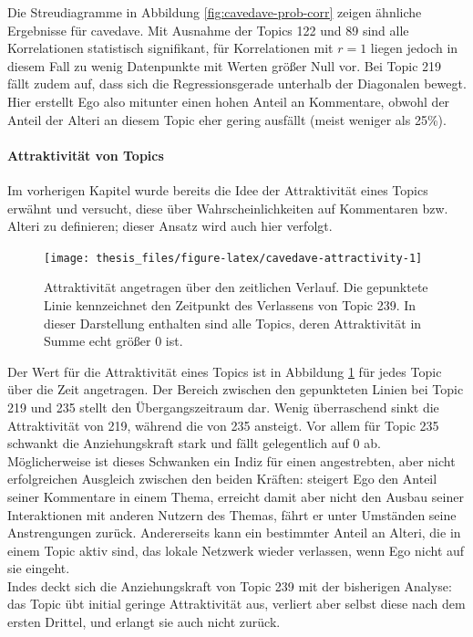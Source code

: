 \documentclass[11pt,a4paper,twoside]{article}
\let\oldpar\paragraph
\renewcommand{\paragraph}{\oldpar*}
\begin{document}
Die Streudiagramme in Abbildung \ref{fig:cavedave-prob-corr} zeigen
ähnliche Ergebnisse für cavedave. Mit Ausnahme der Topics 122 und 89
sind alle Korrelationen statistisch signifikant, für Korrelationen mit
\(\textit{r} = 1\) liegen jedoch in diesem Fall zu wenig Datenpunkte mit
Werten größer Null vor. Bei Topic 219 fällt zudem auf, dass sich die
Regressionsgerade unterhalb der Diagonalen bewegt. Hier erstellt Ego
also mitunter einen hohen Anteil an Kommentare, obwohl der Anteil der
Alteri an diesem Topic eher gering ausfällt (meist weniger als 25\%).

\hypertarget{attraktivitat-von-topics}{%
\paragraph{Attraktivität von Topics}\label{attraktivitat-von-topics}}

Im vorherigen Kapitel wurde bereits die Idee der Attraktivität eines
Topics erwähnt und versucht, diese über Wahrscheinlichkeiten auf
Kommentaren bzw. Alteri zu definieren; dieser Ansatz wird auch hier
verfolgt.






\begin{figure}

{\centering \texttt{[image: thesis\_files/figure-latex/cavedave-attractivity-1]} 

}

\caption{Attraktivität angetragen über den zeitlichen
Verlauf. Die gepunktete Linie kennzeichnet den Zeitpunkt des Verlassens
von Topic 239. In dieser Darstellung enthalten sind alle Topics, deren
Attraktivität in Summe echt größer 0 ist.}\label{fig:cavedave-attractivity}
\end{figure}

Der Wert für die Attraktivität eines Topics ist in Abbildung
\ref{fig:cavedave-attractivity} für jedes Topic über die Zeit
angetragen. Der Bereich zwischen den gepunkteten Linien bei Topic 219
und 235 stellt den Übergangszeitraum dar. Wenig überraschend sinkt die
Attraktivität von 219, während die von 235 ansteigt. Vor allem für Topic
235 schwankt die Anziehungskraft stark und fällt gelegentlich auf 0 ab.
Möglicherweise ist dieses Schwanken ein Indiz für einen angestrebten,
aber nicht erfolgreichen Ausgleich zwischen den beiden Kräften: steigert
Ego den Anteil seiner Kommentare in einem Thema, erreicht damit aber
nicht den Ausbau seiner Interaktionen mit anderen Nutzern des Themas,
fährt er unter Umständen seine Anstrengungen zurück. Andererseits kann
ein bestimmter Anteil an Alteri, die in einem Topic aktiv sind, das
lokale Netzwerk wieder verlassen, wenn Ego nicht auf sie eingeht.\\
Indes deckt sich die Anziehungskraft von Topic 239 mit der bisherigen
Analyse: das Topic übt initial geringe Attraktivität aus, verliert aber
selbst diese nach dem ersten Drittel, und erlangt sie auch nicht zurück.
\end{document}
